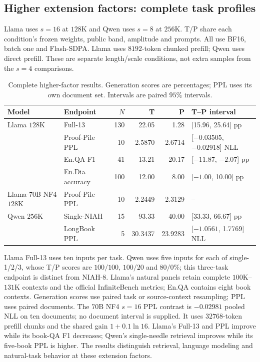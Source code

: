 \subsection{Higher extension factors: complete task profiles}
\label{sec:extreme-new}
Llama uses $s=16$ at $128$K and Qwen uses $s=8$ at $256$K. T/P share each
condition's frozen weights, public band, amplitude and prompts. All use BF16,
batch one and Flash-SDPA. Llama uses $8192$-token chunked prefill; Qwen uses
direct prefill. These are separate length/scale conditions, not extra samples
from the $s=4$ comparisons.
\begin{table}[ht]
\centering\small
\caption{Complete higher-factor results. Generation scores are percentages;
PPL uses its own document set. Intervals are paired $95\%$ intervals.}
\label{tab:extreme-new}
\begin{tabular}{@{}llrrrl@{}}
\toprule
Model & Endpoint & $N$ & T & P & T--P interval \\
\midrule
Llama $128$K & Full-13 & 130 & 22.05 & 1.28 & [15.96, 25.64] pp \\
 & Proof-Pile PPL & 10 & 2.5870 & 2.6714 & [$-0.03505$, $-0.02918$] NLL \\
 & En.QA F1 & 41 & 13.21 & 20.17 & [$-11.87$, $-2.07$] pp \\
 & En.Dia accuracy & 100 & 12.00 & 8.00 & [$-1.00$, 10.00] pp \\
Llama-70B NF4 $128$K & Proof-Pile PPL & 10 & 2.2449 & 2.3129 & -- \\
Qwen $256$K & Single-NIAH & 15 & 93.33 & 40.00 & [33.33, 66.67] pp \\
 & LongBook PPL & 5 & 30.3437 & 23.9283 & [$-1.0561$, 1.7769] NLL \\
\bottomrule
\end{tabular}
\end{table}

Llama Full-13 uses ten inputs per task. Qwen uses five inputs for each of
single-1/2/3, whose T/P scores are $100/100$, $100/20$ and $80/0\%$;
this three-task endpoint is distinct from NIAH-8.
Llama's natural panels retain complete $100$K--$131$K contexts and the official
InfiniteBench metrics; En.QA contains eight book contexts. Generation scores
use paired task or source-context resampling; PPL uses paired documents. The $70$B NF4 $s=16$ PPL contrast is
$-0.02981$ pooled NLL on ten documents; no document interval is supplied.
It uses $32768$-token prefill chunks and the shared gain $1+0.1\ln16$.
Llama's Full-13 and PPL improve while its book-QA F1 decreases; Qwen's single-needle
retrieval improves while its five-book PPL is higher. The results distinguish
retrieval, language modeling and natural-task behavior at these extension factors.
\FloatBarrier
